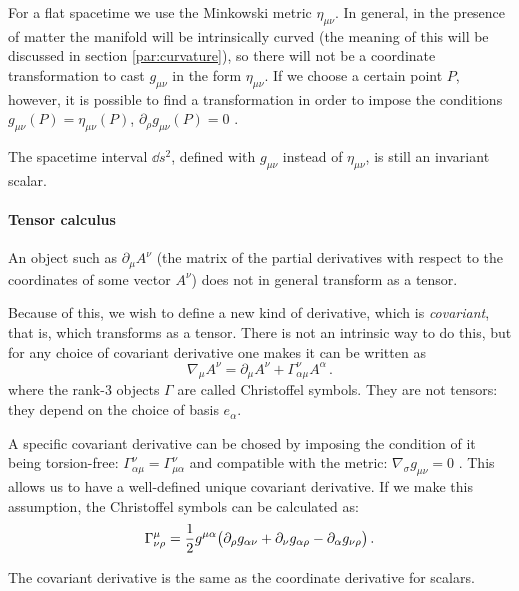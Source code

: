 \documentclass[main.tex]{subfiles}
\begin{document}
For a flat spacetime we use the Minkowski metric \(\eta_{\mu\nu}\). In general, in the presence of matter the manifold will be intrinsically curved (the meaning of this will be discussed in section \ref{par:curvature}), so there will not be a coordinate transformation to cast \(g_{\mu\nu}\) in the form \(\eta_{\mu\nu}\). If we choose a certain point \(P\), however, it is possible to find a transformation in order to impose the conditions \(g_{\mu\nu}(P)=\eta_{\mu\nu}(P)\), \(\partial_\rho g_{\mu\nu}(P) = 0\) \cite[pages 49--50]{Carroll:1997ar}.

The spacetime interval \(\dd{s}^2\), defined with \(g_{\mu\nu}\) instead of \(\eta_{\mu\nu}\), is still an invariant scalar.

\paragraph{Tensor calculus}

An object such as \(\partial_\mu A^\nu\) (the matrix of the partial derivatives with respect to the coordinates of some vector \(A^\nu\)) does not in general transform as a tensor.

Because of this, we wish to define a new kind of derivative, which is \emph{covariant}, that is, which transforms as a tensor. There is not an intrinsic way to do this, but for any choice of covariant derivative one makes it can be written as
\begin{equation}
    \nabla_\mu A^\nu = \partial_\mu A^\nu + \Gamma^\nu _{\alpha \mu}  A^\alpha \,.
\end{equation}
%
where the rank-3 objects $\Gamma$ are called Christoffel symbols.
They are not tensors: they depend on the choice of basis $e_\alpha$.

A specific covariant derivative can be chosed by imposing the condition of it being torsion-free: $\Gamma^\nu_{\alpha \mu} = \Gamma ^\nu _{\mu \alpha}$ and compatible with the metric: \(\nabla_\sigma g_{\mu\nu} = 0\) . This allows us to have a well-defined unique covariant derivative. If we make this assumption, the Christoffel symbols can be calculated as:
%
\begin{equation}  \label{eq:christoffel-symbols-from-metric}
    \Gamma^\mu_{\nu \rho} = \frac{1}{2} g^{\mu \alpha} \qty(
    \partial_\rho g_{\alpha \nu} +
    \partial_\nu g_{\alpha \rho} -
    \partial_\alpha g_{\nu \rho}
    )\,.
\end{equation}

The covariant derivative is the same as the coordinate derivative for scalars.
\end{document}
